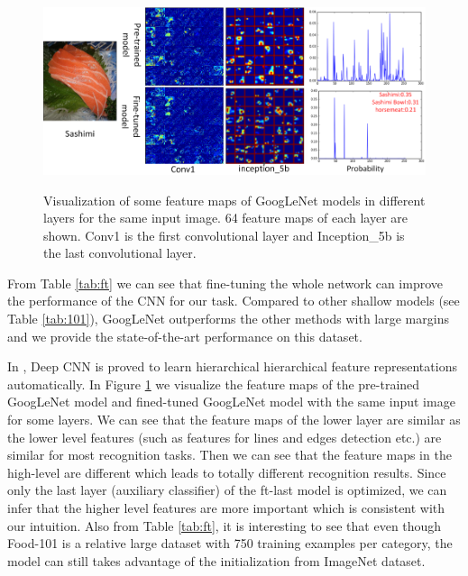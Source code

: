 \begin{figure}[htbp]
  \centering
  \includegraphics[scale=0.5]{fig/sashimi.png}\\
  \caption{Visualization of some feature maps of GoogLeNet models in different layers for the same input image. 64 feature maps of each layer are shown. Conv1 is the first convolutional layer and Inception\_5b is the last convolutional layer. }
   \label{fig:sashimi}
\end{figure}
From Table \ref{tab:ft} we can see that fine-tuning the whole network can improve the performance of the CNN for our task. Compared to other shallow models (see Table \ref{tab:101}), GoogLeNet outperforms the other methods with large margins and we provide the state-of-the-art performance on this dataset.

In \cite{farabet2013learning}, Deep CNN is proved to learn hierarchical hierarchical feature representations automatically.
In Figure \ref{fig:sashimi} we visualize the feature maps of the pre-trained GoogLeNet model and fined-tuned GoogLeNet model with the same input image for some layers. We can see that the feature maps of the lower layer are similar as the lower level features (such as features for lines and edges detection etc.) are similar for most recognition tasks.
Then we can see that the feature maps in the high-level are different which leads to totally different recognition results.
Since only the last layer (auxiliary classifier) of the ft-last model is optimized, we can infer that the higher level features are more important which is consistent with our intuition. Also from Table \ref{tab:ft}, it is interesting to see that even though Food-101 is a relative large dataset with 750 training examples per category, the model can still takes advantage of the initialization from ImageNet dataset.

